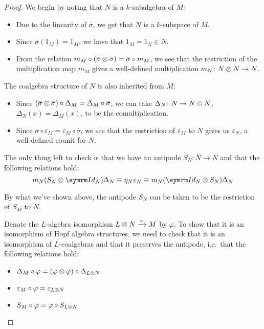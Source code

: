 \begin{proof}
We begin by noting that \(N\) is a \(k\)-subalgebra of \(M\):
\begin{itemize}
    \item Due to the linearity of \(\overline{\sigma}\), we get that \(N\) is a \(k\)-subspace of \(M\).

    \item Since \(\overline{\sigma} \left(1_M\right) = 1_M\), we have that \(1_M = 1_N \in N\).

    \item From the relation \(m_{M} \circ (\overline{\sigma} \otimes \overline{\sigma}) = \overline{\sigma} \circ m_{M}\), we see that the restriction of the multiplication map \(m_M\) gives a well-defined multiplication \(m_{N} \colon N \otimes N \to N\).
\end{itemize}

The coalgebra structure of \(N\) is also inherited from \(M\):
\begin{itemize}
    \item Since \((\overline{\sigma} \otimes \overline{\sigma}) \circ \Delta_M = \Delta_M \circ \overline{\sigma}\), we can take \(\Delta_N \colon N \to N \otimes N\), \(\Delta_N (x) = \Delta_M (x)\), to be the comultiplication.

    \item Since \(\sigma \circ \varepsilon_M = \varepsilon_M \circ \overline{\sigma}\), we see that the restriction of \(\varepsilon_M\) to \(N\) gives us \(\varepsilon_N\), a well-defined counit for \(N\).
\end{itemize}

The only thing left to check is that we have an antipode \(S_N \colon N \to N\) and that the following relations hold:
\[
    m_N (S_N \tensor \Id_N) \Delta_N \equiv \eta_N \varepsilon_N \equiv m_N (\Id_N \tensor S_N) \Delta_N
\]

By what we've shown above, the antipode \(S_N\) can be taken to be the restriction of \(S_M\) to \(N\).

Denote the \(L\)-algebra isomorphism \(L \otimes N \xrightarrow{\sim} M\) by \(\varphi\). To show that it is an isomorphism of Hopf algebra structures, we need to check that it is an isomorphism of \(L\)-coalgebras and that it preserves the antipode, i.e.\ that the following relations hold:
\begin{itemize}
    \item \(\Delta_M \circ \varphi = (\varphi \otimes \varphi) \circ \Delta_{L \otimes N}\)
    \item \(\varepsilon_M \circ \varphi = \varepsilon_{L \otimes N}\)
    \item \(S_M \circ \varphi = \varphi \circ S_{L \otimes N}\)
\end{itemize}


\end{proof}
